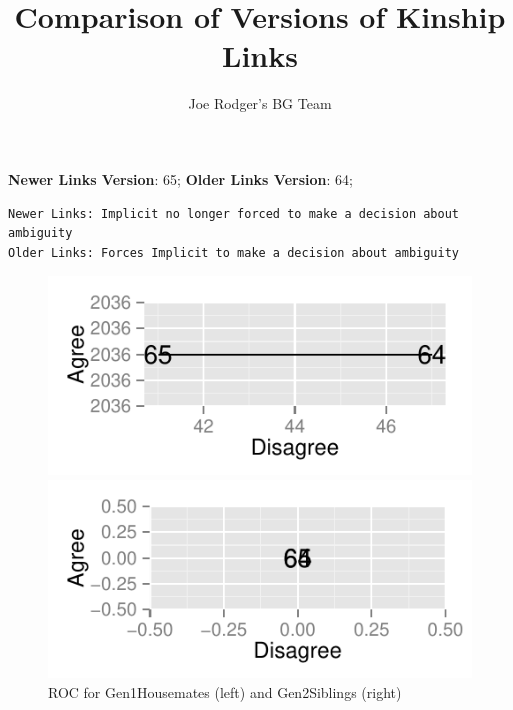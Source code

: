 \documentclass[a4paper]{article}\usepackage{graphicx, color}
\title{Comparison of Versions of Kinship Links}
\author{Joe Rodger's BG Team}
\makeatletter
\def\maxwidth{ %
  \ifdim\Gin@nat@width>\linewidth
    \linewidth
  \else
    \Gin@nat@width
  \fi
}
\newenvironment{kframe}{%
 \def\at@end@of@kframe{}%
 \ifinner\ifhmode%
  \def\at@end@of@kframe{\end{minipage}}%
  \begin{minipage}{\columnwidth}%
 \fi\fi%
 \def\FrameCommand##1{\hskip\@totalleftmargin \hskip-\fboxsep
 \colorbox{shadecolor}{##1}\hskip-\fboxsep
     \hskip-\linewidth \hskip-\@totalleftmargin \hskip\columnwidth}%
 \MakeFramed {\advance\hsize-\width
   \@totalleftmargin\z@ \linewidth\hsize
   \@setminipage}}%
 {\par\unskip\endMakeFramed%
 \at@end@of@kframe}
\newenvironment{knitrout}{}{} %
\makeatother
\begin{document}
\maketitle

\setlength{\parindent}{0pt}%







\textbf{Newer Links Version}: 65;
\textbf{Older Links Version}: 64;

\begin{knitrout}
\color{fgcolor}\begin{kframe}
\begin{verbatim}
Newer Links: Implicit no longer forced to make a decision about ambiguity
Older Links: Forces Implicit to make a decision about ambiguity
\end{verbatim}
\end{kframe}
\end{knitrout}


\begin{figure}[htbp]
\begin{knitrout}
\color{fgcolor}
\includegraphics[width=\maxwidth]{figure/unnamed-chunk-31} 

\includegraphics[width=\maxwidth]{figure/unnamed-chunk-32} 

\end{knitrout}

\caption{ROC for Gen1Housemates (left) and Gen2Siblings (right)}
\end{figure}
\end{document}
